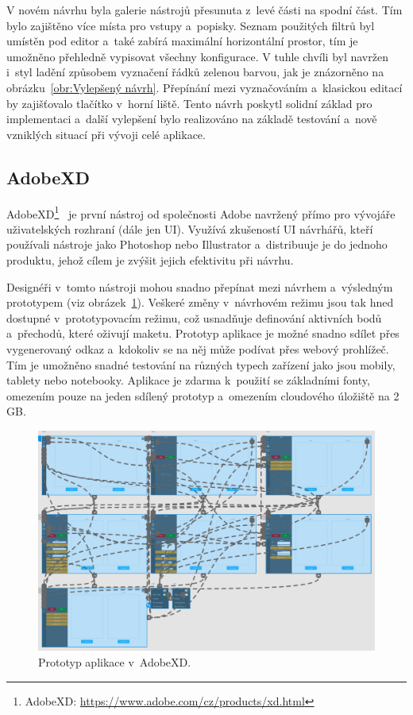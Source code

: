 V novém návrhu byla galerie nástrojů přesunuta z~levé části na spodní část. Tím bylo zajištěno více místa pro vstupy a~popisky. Seznam použitých filtrů byl umístěn pod editor a~také zabírá maximální horizontální prostor, tím je umožněno přehledně vypisovat všechny konfigurace. V tuhle chvíli byl navržen i~styl ladění způsobem vyznačení řádků zelenou barvou, jak je znázorněno na obrázku~\ref{obr:Vylepšený návrh}. Přepínání mezi vyznačováním a~klasickou editací by zajišťovalo tlačítko  v~horní liště. Tento návrh poskytl solidní základ pro implementaci a~další vylepšení bylo realizováno na základě testování a~nově vzniklých situací při vývoji celé aplikace.

\subsection*{AdobeXD}
AdobeXD\footnote{AdobeXD: \url{https://www.adobe.com/cz/products/xd.html}}~\cite{article:AdobeXD} je první nástroj od společnosti Adobe navržený přímo pro vývojáře uživatelských rozhraní (dále jen UI). Využívá zkušeností UI návrhářů, kteří používali nástroje jako Photoshop nebo Illustrator a~distribuuje je do jednoho produktu, jehož cílem je zvýšit jejich efektivitu při návrhu.

Designéři v~tomto nástroji mohou snadno přepínat mezi návrhem a~výsledným prototypem (viz obrázek~\ref{obr:Prototyp v AdobeXD}). Veškeré změny v~návrhovém režimu jsou tak hned dostupné v~prototypovacím režimu, což usnadňuje definování aktivních bodů a~přechodů, které oživují maketu. Prototyp aplikace je možné snadno sdílet přes vygenerovaný odkaz a~kdokoliv se na něj může podívat přes webový prohlížeč. Tím je umožněno snadné testování na různých typech zařízení jako jsou mobily, tablety nebo notebooky. Aplikace je zdarma k~použití se základními fonty, omezením pouze na jeden sdílený prototyp a~omezením cloudového úložiště na 2 GB.
\begin{figure}[hbt]
	\centering
	\includegraphics[width=1\textwidth]{obrazky-figures/AdobeXD_prototyp.png}
	\caption{Prototyp aplikace v~AdobeXD.}
	\label{obr:Prototyp v AdobeXD}
\end{figure}

